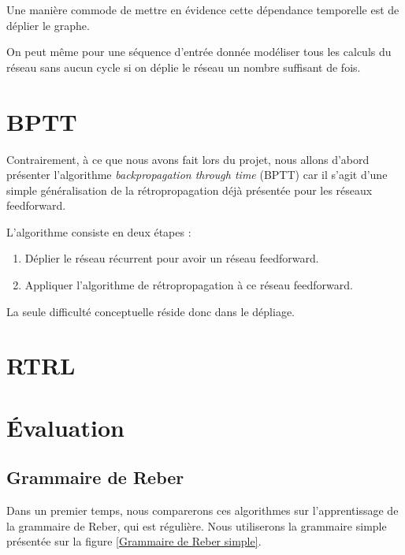 Une manière commode de mettre en évidence cette dépendance temporelle est de déplier le graphe. 


On peut même pour une séquence d'entrée donnée modéliser tous les calculs du réseau sans aucun cycle si on déplie le réseau un nombre suffisant de fois.


\section{BPTT}

Contrairement, à ce que nous avons fait lors du projet, nous allons d'abord présenter l'algorithme \textit{backpropagation through time} (BPTT) car il s'agit d'une simple généralisation de la rétropropagation déjà présentée pour les réseaux feedforward.

L'algorithme consiste en deux étapes :
\begin{enumerate}
\item Déplier le réseau récurrent pour avoir un réseau feedforward.
\item Appliquer l'algorithme de rétropropagation à ce réseau feedforward.
\end{enumerate}

La seule difficulté conceptuelle réside donc dans le dépliage.

\section{RTRL}

\section{Évaluation}

\subsection{Grammaire de Reber}

Dans un premier temps, nous comparerons ces algorithmes sur l'apprentissage de la grammaire de Reber, qui est régulière. Nous utiliserons la grammaire simple présentée sur la figure \ref{Grammaire de Reber simple}.

